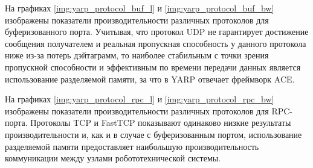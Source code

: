 На графиках \ref{img:yarp_protocol_buf_l} и \ref{img:yarp_protocol_buf_bw} изображены показатели производительности различных протоколов для буферизованного порта. Учитывая, что протокол UDP не гарантирует достижение сообщения получателем и реальная пропускная способность у данного протокола ниже из-за потерь дэйтаграмм, то наиболее стабильным с точки зрения пропускной способности и эффективным по времени передачи данных является использование разделяемой памяти, за что в YARP отвечает фреймворк ACE.

На графиках \ref{img:yarp_protocol_rpc_l} и \ref{img:yarp_protocol_rpc_bw} изображены показатели производительности различных протоколов для RPC-порта. Протоколы TCP и FastTCP показывают одинаково низкие результаты производительности и, как и в случае с буферизованным портом, использование разделяемой памяти предоставляет наибольшую производительность коммуникации между узлами робототехнической системы.





